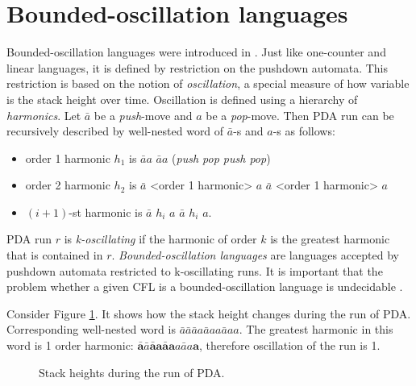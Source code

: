 \section{Bounded-oscillation languages}
\label{sec:osc}
Bounded-oscillation languages were introduced in \cite{BoundOsc}. Just like one-counter and linear languages, it is defined by restriction on the pushdown automata. This restriction is based on the notion of \textit{oscillation}, a special measure of how variable is the stack height over time. Oscillation is defined using a hierarchy of \textit{harmonics}. Let $\bar{a}$ be a \textit{push}-move and $a$ be a \textit{pop}-move. Then PDA run can be recursively described by well-nested word of $\bar{a}$-s and $a$-s as follows:
\begin{itemize}
\item  order 1 harmonic $h_1$ is $\bar{a}a$ $\bar{a}a$ (\textit{push pop push pop})
\item  order 2 harmonic $h_2$ is $\bar{a}$ <order 1 harmonic> $a$ $\bar{a}$ <order 1 harmonic> $a$
\item  $(i+1)$-st harmonic is $\bar{a}$ $h_i$ $a$ $\bar{a}$ $h_i$ $a$.
\end{itemize}


PDA run $r$ is \textit{k-oscillating} if the harmonic of order $k$ is the greatest harmonic that is contained in $r$. \textit{Bounded-oscillation languages} are languages accepted by pushdown automata restricted to k-oscillating runs. It is important that the problem whether a given CFL is a bounded-oscillation language is undecidable \cite{BoundOsc}.
\begin{example}
Consider Figure \ref{oscb}. It shows how the stack height changes during the run of PDA. Corresponding well-nested word is $\bar{a}\bar{a}\bar{a}a\bar{a}aa\bar{a}aa$. The greatest harmonic in this word is 1 order harmonic: $\mathbf{\bar{a}}\bar{a}\mathbf{\bar{a}a}\mathbf{\bar{a}a}a\bar{a}a\mathbf{a}$, therefore oscillation of the run is 1.
\end{example}
\begin{figure}
\caption{Stack heights during the run of PDA.}
\label{oscb}
\end{figure}


